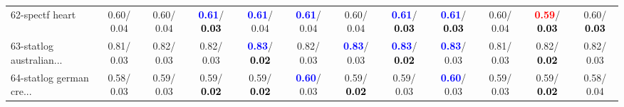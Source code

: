 \begin{table}[h]
\begin{center}
{\begin{tabular}{lc|c|c|c|c|c|c|c|c|c|c}
62-spectf heart &   0.60/  0.04 &   0.60/  0.04 & \textcolor{blue}{\textbf{  0.61}}/\textcolor{black}{\textbf{  0.03}} & \textcolor{blue}{\textbf{  0.61}}/  0.04 & \textcolor{blue}{\textbf{  0.61}}/  0.04 &   0.60/  0.04 & \textcolor{blue}{\textbf{  0.61}}/\textcolor{black}{\textbf{  0.03}} & \textcolor{blue}{\textbf{  0.61}}/\textcolor{black}{\textbf{  0.03}} &   0.60/  0.04 & \textcolor{red}{\textbf{  0.59}}/\textcolor{black}{\textbf{  0.03}} &   0.60/\textcolor{black}{\textbf{  0.03}} \\
63-statlog australian... &   0.81/  0.03 &   0.82/  0.03 &   0.82/  0.03 & \textcolor{blue}{\textbf{  0.83}}/\textcolor{black}{\textbf{  0.02}} &   0.82/  0.03 & \textcolor{blue}{\textbf{  0.83}}/  0.03 & \textcolor{blue}{\textbf{  0.83}}/\textcolor{black}{\textbf{  0.02}} & \textcolor{blue}{\textbf{  0.83}}/  0.03 &   0.81/  0.03 &   0.82/\textcolor{black}{\textbf{  0.02}} &   0.82/  0.03 \\
64-statlog german cre... &   0.58/  0.03 &   0.59/  0.03 &   0.59/\textcolor{black}{\textbf{  0.02}} &   0.59/\textcolor{black}{\textbf{  0.02}} & \textcolor{blue}{\textbf{  0.60}}/  0.03 &   0.59/\textcolor{black}{\textbf{  0.02}} &   0.59/  0.03 & \textcolor{blue}{\textbf{  0.60}}/  0.03 &   0.59/  0.03 &   0.59/\textcolor{black}{\textbf{  0.02}} &   0.58/  0.04 \\\end{tabular}
}\label{strats1aC4.5w}
\end{center}
\end{table}
